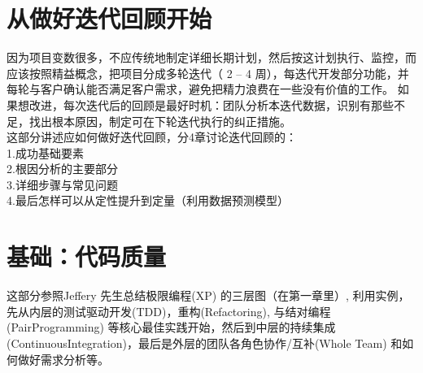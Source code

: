 \documentclass{book}        %
\begin{document}

\part{从做好迭代回顾开始 }因为项目变数很多，不应传统地制定详细长期计划，然后按这计划执行、监控，而应该按照精益概念，把项目分成多轮迭代（ 2 – 4 周），每迭代开发部分功能，并每轮与客户确认能否满足客户需求，避免把精力浪费在一些没有价值的工作。 如果想改进，每次迭代后的回顾是最好时机：团队分析本迭代数据，识别有那些不足，找出根本原因，制定可在下轮迭代执行的纠正措施。\\

这部分讲述应如何做好迭代回顾，分4章讨论迭代回顾的：\\

1.成功基础要素\\
2.根因分析的主要部分\\
3.详细步骤与常见问题\\
4.最后怎样可以从定性提升到定量（利用数据预测模型）\\





\part{基础：代码质量}这部分参照Jeffery 先生总结极限编程(XP) 的三层图（在第一章里）, 利用实例，先从内层的测试驱动开发(TDD)，重构(Refactoring), 与结对编程(PairProgramming) 等核心最佳实践开始，然后到中层的持续集成(ContinuousIntegration)，最后是外层的团队各角色协作/互补(Whole Team) 和如何做好需求分析等。
\end{document}
